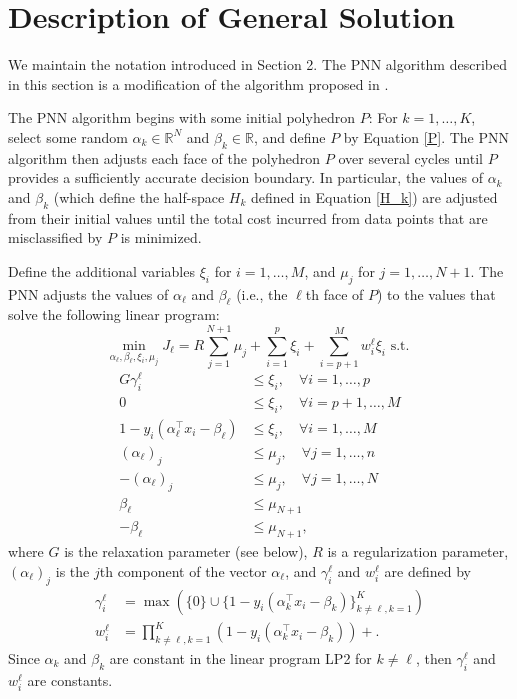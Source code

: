 \documentclass[12pt, a4paper, notitlepage]{report}
\newcommand{\RR}{\mathbb{R}}
\begin{document}
\section{Description of General Solution} \label{Solution}

We maintain the notation introduced in Section 2. The PNN algorithm described in this section is a modification of the algorithm proposed in \cite{Dundar}.

The PNN algorithm begins with some initial polyhedron $P$: For $k=1,\ldots,K$, select some random $\alpha_k\in\RR^N$ and $\beta_k\in\RR$, and define $P$ by Equation \ref{P}. The PNN algorithm then adjusts each face of the polyhedron $P$ over several cycles until $P$ provides a sufficiently accurate decision boundary. In particular, the values of $\alpha_k$ and $\beta_k$ (which define the half-space $H_k$ defined in Equation \ref{H_k}) are adjusted from their initial values until the total cost incurred from data points that are misclassified by $P$ is minimized.

Define the additional variables $\xi_i$ for $i=1,\ldots,M$, and $\mu_j$ for $j=1,\ldots,N+1$. The PNN adjusts the values of $\alpha_\ell$ and $\beta_\ell$ (i.e., the $\ell$th face of $P$) to the values that solve the following linear program:
\[ \min_{\alpha_\ell,\beta_\ell,\xi_i,\mu_j} J_\ell = R\sum_{j=1}^{N+1}\mu_j + \sum_{i=1}^p \xi_i + \sum_{i=p+1}^M w_i^\ell \xi_i
\mbox{ s.t. } \tag{LP2} \]
\begin{align*}
G\gamma_i^\ell &\leq \xi_i, \quad\forall i=1,\ldots,p \tag{Constraint 1} \\
0 &\leq \xi_i, \quad\forall i=p+1,\ldots,M \tag{Constraint 2} \\
1-y_i(\alpha_\ell^\top x_i-\beta_\ell) &\leq \xi_i, \quad\forall i=1,\ldots,M \tag{Constraint 3} \\
(\alpha_\ell)_j &\leq \mu_j, \quad\forall j=1,\ldots,n \tag{Constraint 4} \\
-(\alpha_\ell)_j &\leq \mu_j, \quad\forall j=1,\ldots,N \tag{Constraint 5} \\
\beta_\ell &\leq \mu_{N+1} \tag{Constraint 6} \\
-\beta_\ell &\leq \mu_{N+1}, \tag{Constraint 7}
\end{align*}
where $G$ is the relaxation parameter (see below), $R$ is a regularization parameter, $(\alpha_\ell)_j$ is the $j$th component of the vector $\alpha_\ell$, and $\gamma_i^\ell$ and $w_i^\ell$ are defined by
\begin{align*}
\gamma_i^\ell &= \max\left(\{0\}\cup \{1-y_i(\alpha_k^\top x_i-\beta_k)\}_{k\neq\ell,k=1}^K\right) \\
w_i^\ell &= \prod_{k\neq\ell,k=1}^K (1-y_i(\alpha_k^\top x_i-\beta_k))+.
\end{align*}
Since $\alpha_k$ and $\beta_k$ are constant in the linear program LP2 for $k\neq\ell$, then $\gamma_i^\ell$ and $w_i^\ell$ are constants.
\end{document}
